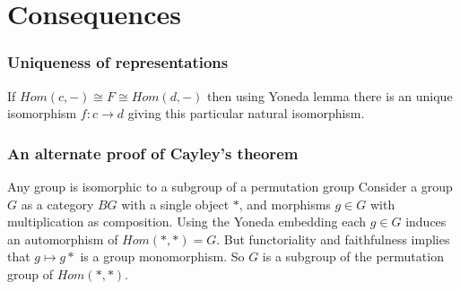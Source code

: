 \documentclass[10.5pt,compress]{beamer}
\begin{document}

\section{Consequences}\label{frame : uniqueness of representations}
\begin{frame}
\frametitle{Uniqueness of representations}

If $Hom(c,-) \cong F \cong Hom(d,-)$ then using Yoneda lemma there is an unique
isomorphism $f : c \to d$ giving this particular natural isomorphism.
\end{frame}



\begin{frame}[fragile]\label{frame : alt proof of Cayley's theorem}

\frametitle{An alternate proof of Cayley's theorem}
\begin{block}{Any group is isomorphic to a subgroup of a permutation group}
\smallskip
Consider a group $G$ as a category $BG$ with a single object $*$, and morphisms $g \in G$ with 
multiplication as composition. Using the Yoneda embedding each $g \in G$ 
induces an automorphism of $Hom(*,*) = G$. But functoriality and faithfulness implies 
that $g \mapsto g*$ is a group monomorphism. So $G$ is a subgroup of the
permutation group of $Hom(*,*)$. 
\color{beamer@mathtext}{
\begin{equation*} 
\begin{tikzcd}
* \arrow[r,"g"] \arrow[d,dashed] & * \arrow[d, dashed] \\
Hom(*,*) \arrow[r,"g^*"] & Hom(*,*)
\end{tikzcd}
\end{equation*}}


\end{block}	
	
\end{frame}

\end{document}

